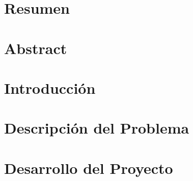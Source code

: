 \documentclass[11pt,twoside]{thesis}
\begin{document}
\maketitle
\makecoverletter


\chapter*{Resumen} 


\chapter*{Abstract} 

  
  
\tableofcontents 


\dominitoc
\cleardoublepage

\chapter*{Introducci\'on}


\chapter{Descripci\'on del Problema}


\chapter{Desarrollo del Proyecto}






\nocite{1}
\nocite{2}
\nocite{3}
\nocite{4}
\nocite{5}
\nocite{6}
\nocite{7}
\nocite{8}
\nocite{9}
\nocite{10}
\nocite{11}
\nocite{12}
\nocite{13}
\nocite{14}
\nocite{16}
\nocite{17}
\nocite{18}
\nocite{19}
\nocite{20}
\nocite{21}
\nocite{22}
\nocite{23}
\nocite{25}
\nocite{26}
\nocite{27}
\nocite{28}
\nocite{29}

\end{document}
